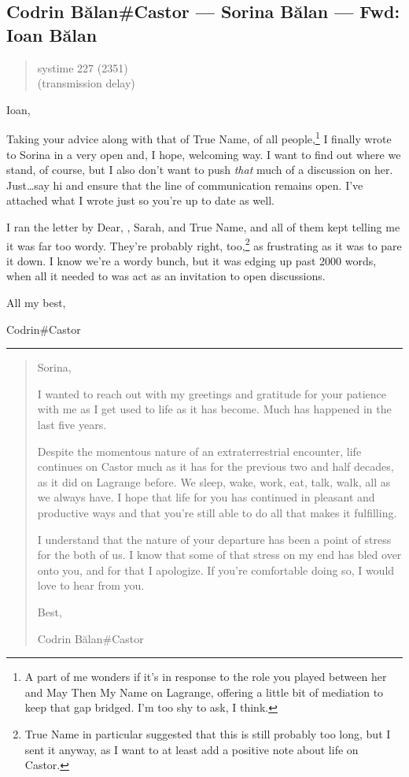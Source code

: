 \hypertarget{codrin-bux103lancastor-sorina-bux103lan-fwd-ioan-bux103lan}{%
\subsection{Codrin Bălan\#Castor — Sorina Bălan — Fwd: Ioan Bălan}\label{codrin-bux103lancastor-sorina-bux103lan-fwd-ioan-bux103lan}}

\begin{quote}
systime 227 (2351)\\
(transmission delay)
\end{quote}

Ioan,

Taking your advice along with that of True Name, of all people,\footnote{A part of me wonders if it's in response to the role you played between her and May Then My Name on Lagrange, offering a little bit of mediation to keep that gap bridged. I'm too shy to ask, I think.} I finally wrote to Sorina in a very open and, I hope, welcoming way. I want to find out where we stand, of course, but I also don't want to push \emph{that} much of a discussion on her. Just\ldots{}say hi and ensure that the line of communication remains open. I've attached what I wrote just so you're up to date as well.

I ran the letter by Dear, \Partner , Sarah, and True Name, and all of them kept telling me it was far too wordy. They're probably right, too,\footnote{True Name in particular suggested that this is still probably too long, but I sent it anyway, as I want to at least add a positive note about life on Castor.} as frustrating as it was to pare it down. I know we're a wordy bunch, but it was edging up past 2000 words, when all it needed to was act as an invitation to open discussions.

All my best,

Codrin\#Castor

\begin{center}\rule{0.5\linewidth}{0.5pt}\end{center}

\begin{quote}
Sorina,

I wanted to reach out with my greetings and gratitude for your patience with me as I get used to life as it has become. Much has happened in the last five years.

Despite the momentous nature of an extraterrestrial encounter, life continues on Castor much as it has for the previous two and half decades, as it did on Lagrange before. We sleep, wake, work, eat, talk, walk, all as we always have. I hope that life for you has continued in pleasant and productive ways and that you're still able to do all that makes it fulfilling.

I understand that the nature of your departure has been a point of stress for the both of us. I know that some of that stress on my end has bled over onto you, and for that I apologize. If you're comfortable doing so, I would love to hear from you.

Best,

Codrin Bălan\#Castor
\end{quote}
